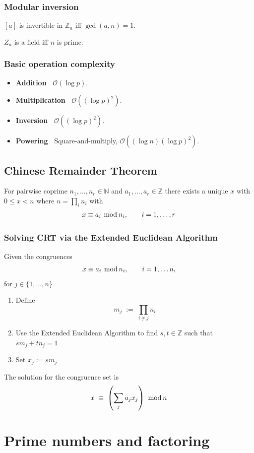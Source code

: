 \documentclass[a4paper]{scrartcl}
\newcommand\paren[1]{\left( #1 \right)}
\newcommand\N{\mathbb N}
\newcommand\Z{\mathbb Z}
\newcommand\bigO{\mathcal O}
\renewcommand\mod{\hspace*{0.4em}\mathrm{mod}\hspace*{0.2em}}
\newcommand\linetag[1]{\textbf{\sffamily#1\;\ }}
\begin{document}
\subsubsection{Modular inversion}
$[a]$ is invertible in $\Z_n$ iff $\gcd(a,n)=1$.

$Z_n$ is a field iff $n$ is prime.

\subsubsection{Basic operation complexity}

\begin{itemize}
    \item \linetag{Addition} $\bigO(\log p)$. 
    \item \linetag{Multiplication} $\bigO((\log p)^2)$.
    \item \linetag{Inversion} $\bigO((\log p)^2)$.
    \item \linetag{Powering} Square-and-multiply, $\bigO((\log n)(\log p)^2)$.
\end{itemize}

\subsection{Chinese Remainder Theorem}

For pairwise coprime $n_1,\hdots,n_r\in\N$ and $a_1,\hdots,a_r\in\Z$ there exists a unique $x$ with $0\leq x< n$ where $n=\prod_in_i$ with \[x\equiv a_i\mod n_i,\qquad i=1,\hdots,r\]

\subsubsection{Solving CRT via the Extended Euclidean Algorithm}

Given the congruences\[x\equiv a_i\mod n_i,\qquad i=1,\hdots n,\]for $j\in\{1,\hdots,n\}$

\smallskip
\begin{enumerate}
    \item Define\[m_j\;:=\;\prod_{i\neq j}n_i\]
    \item Use the Extended Euclidean Algorithm to find $s,t\in\Z$ such that $sm_j+tn_j=1$
    \item Set $x_j:=sm_j$
\end{enumerate}
\smallskip

The solution for the congruence set is \[x\;\equiv\;\paren{\sum_ja_jx_j}\mod n\]

\section{Prime numbers and factoring}
\end{document}
